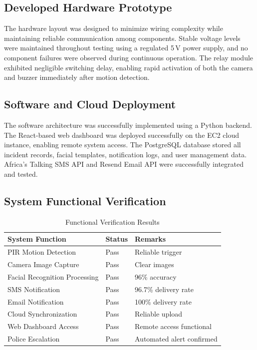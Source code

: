 \documentclass[12pt,a4paper,oneside]{report}
\begin{document}
\subsection{Developed Hardware Prototype}

The hardware layout was designed to minimize wiring complexity while maintaining reliable communication among components. Stable voltage levels were maintained throughout testing using a regulated 5\,V power supply, and no component failures were observed during continuous operation. The relay module exhibited negligible switching delay, enabling rapid activation of both the camera and buzzer immediately after motion detection.

\subsection{Software and Cloud Deployment}

The software architecture was successfully implemented using a Python backend. The React-based web dashboard was deployed successfully on the EC2 cloud instance, enabling remote system access. The PostgreSQL database stored all incident records, facial templates, notification logs, and user management data. Africa's Talking SMS API and Resend Email API were successfully integrated and tested.

\subsection{System Functional Verification}

\begin{table}[htbp]
  \centering
  \caption{Functional Verification Results}
  {\small
  \begin{tabular}{|p{6.00cm}|p{3.00cm}|p{5.00cm}|}
    \hline
    \textbf{System Function} & \textbf{Status} & \textbf{Remarks} \\
    \hline
    PIR Motion Detection          & Pass & Reliable trigger \\
    Camera Image Capture          & Pass & Clear images \\
    Facial Recognition Processing & Pass & 96\% accuracy \\
    SMS Notification              & Pass & 96.7\% delivery rate \\
    Email Notification            & Pass & 100\% delivery rate \\
    Cloud Synchronization         & Pass & Reliable upload \\
    Web Dashboard Access          & Pass & Remote access functional \\
    Police Escalation             & Pass & Automated alert confirmed \\
    \hline
  \end{tabular}
  }
\end{table}
\end{document}
